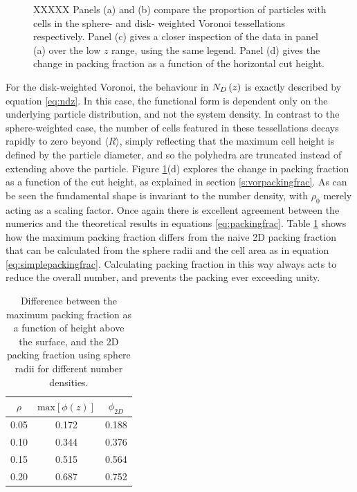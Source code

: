 \begin{figure}
	\caption{XXXXX Panels (a) and (b) compare the proportion of particles with cells in the sphere\-- and disk\-- weighted Voronoi tessellations respectively.
	Panel (c) gives a closer inspection of the data in panel (a) over the low $z$ range, using the same legend.
	Panel (d) gives the change in packing fraction as a function of the horizontal cut height.}
	\label{fig:nphi}
\end{figure}

For the disk\--weighted Voronoi, the behaviour in $N_D\left(z\right)$ is exactly described by equation \eqref{eq:ndz}.
In this case, the functional form is dependent only on the underlying particle distribution, and not the system density. 
In contrast to the sphere\--weighted case, the number of cells featured in these tessellations decays rapidly to zero beyond $\langle R\rangle$, simply reflecting that the maximum cell height is defined by the particle diameter, and so the polyhedra are truncated instead of extending above the particle.
Figure \ref{fig:nphi}(d) explores the change in packing fraction as a function of the cut height, as explained in section \ref{s:vorpackingfrac}.
As can be seen the fundamental shape is invariant to the number density, with $\rho_0$ merely acting as a scaling factor. 
Once again there is excellent agreement between the numerics and the theoretical results in equations \eqref{eq:packingfrac}.
Table \ref{tab:packingfrac} shows how the maximum packing fraction differs from the naive 2D packing fraction that can be calculated from the sphere radii and the cell area as in equation \eqref{eq:simplepackingfrac}.
Calculating packing fraction in this way always acts to reduce the overall number, and prevents the packing ever exceeding unity.

\begin{table}[h]
\caption{Difference between the maximum packing fraction as a function of height above the surface, and the 2D packing fraction using sphere radii for different number densities.}
\label{tab:packingfrac}
\centering
\begin{tabular}{ccc}
	\toprule
        $\rho$ & $\text{max}\left[\phi\left(z\right)\right]$ & $\phi_{2D}$ \\
        \midrule
	0.05 & 0.172 & 0.188 \\
	0.10 & 0.344 & 0.376 \\
	0.15 & 0.515 & 0.564 \\
	0.20 & 0.687 & 0.752 \\
	\bottomrule
\end{tabular}
\end{table}

